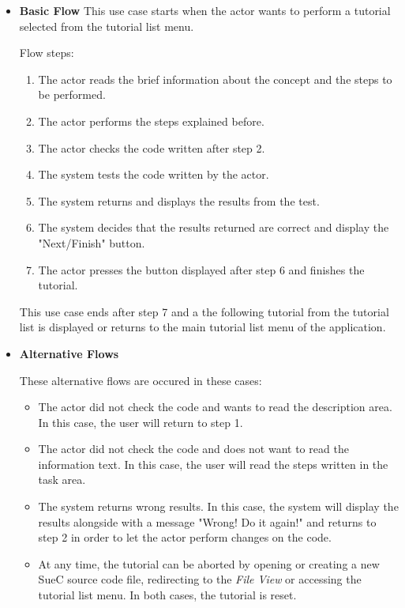 \documentclass[12pt,a4paper,twoside]{report}
\begin{document}
\begin{itemize}
	\item \textbf{Basic Flow}
	This use case starts when the actor wants to perform a tutorial selected from the tutorial list menu.
	
	Flow steps:
	\begin{enumerate}
		\item The actor reads the brief information about the concept and the steps to be performed.
		\item The actor performs the steps explained before.
		\item The actor checks the code written after step 2.
		\item The system tests the code written by the actor.
		\item The system returns and displays the results from the test.
		\item The system decides that the results returned are correct and display the "Next/Finish" button.
		\item The actor presses the button displayed after step 6 and finishes the tutorial.
	\end{enumerate}
	
	This use case ends after step 7 and a the following tutorial from the tutorial list is displayed or returns to the main tutorial list menu of the application.
	\item \textbf{Alternative Flows}
	
	These alternative flows are occured in these cases:
	
	\begin{itemize}
		\item The actor did not check the code and wants to read the description area. In this case, the user will return to step 1.
		\item The actor did not check the code and does not want to read the information text. In this case, the user will read the steps written in the task area.
		\item The system returns wrong results. In this case, the system will display the results alongside with a message "Wrong! Do it again!" and returns to step 2 in order to let the actor perform changes on the code.
		\item At any time, the tutorial can be aborted by opening or creating a new SueC source code file, redirecting to the \textit{File View} or accessing the tutorial list menu. In both cases, the tutorial is reset.
	\end{itemize}
\end{itemize}
\end{document}
